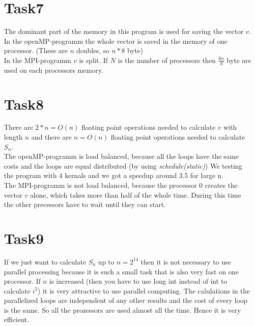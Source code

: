 \documentclass[11pt,titlepage] {article}
\begin{document}
\section{Task7}
The dominant part of the memory in this program is used for saving the vector $v$. In the openMP-programm the whole vector is saved in the memory of one processor. (These are $n$ doubles, so $n*8$ byte)\\
In the MPI-programm $v$ is split. If $N$ is the number of processors then $\frac{8n}{N}$ byte are used on each processors memory.

\section{Task8}
There are $2*n=O(n)$ floating point operations needed to calculate $v$ with length $n$ and there are $n=O(n)$ floating point operations needed to calculate $S_n$.\\
The openMP-programm is load balanced, because all the loops have the same costs and the loops are equal distributed (by using \textit{schedule(static)}) We testing the program with 4 kernals and we got a speedup around 3.5 for large n.\\
The MPI-programm is not load balanced, because the processor $0$ creates the vector $v$ alone, which takes more than half of the whole time. During this time the other precessors have to wait until they can start. 

\section{Task9}
If we just want to calculate $S_n$ up to $n=2^{14}$ then it is not necessary to use parallel processing because it is such a small task that is also very fast on one processor. If $n$ is increased (then you have to use long int instead of int to calculate $i^2$) it is very attractive to use parallel computing. The calulations in the parallelized loops are independent of any other results and the cost of every loop is the same. So all the prozessors are used almost all the time. Hence it is very efficient. 
\end{document}
